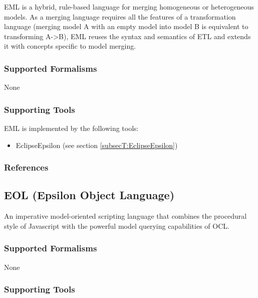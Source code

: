 

EML is a hybrid, rule-based language for merging homogeneous or heterogeneous models. As a merging language requires all the features of a transformation language (merging model A with an empty model into model B is equivalent to transforming A->B), EML reuses the syntax and semantics of ETL and extends it with concepts specific to model merging.

\subsubsection{Supported Formalisms}

None


\subsubsection{Supporting Tools}

EML is implemented by the following tools:
\begin{itemize}
	\item EclipseEpsilon (see section \ref{subsecT:EclipseEpsilon})
\end{itemize}


\subsubsection{References}





\subsection{EOL (Epsilon Object Language)}
\label{subsecL:EOL}


An imperative model-oriented scripting language that combines the procedural style of Javascript with the powerful model querying capabilities of OCL.

\subsubsection{Supported Formalisms}

None


\subsubsection{Supporting Tools}

